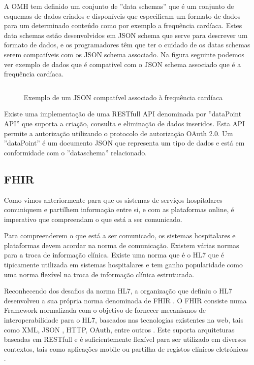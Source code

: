A \gls{OMH} tem definido um conjunto de ''data schemas'' que é um conjunto de esquemas de dados criados e disponíveis que especificam um formato de dados para um determinado conteúdo como por exemplo a frequência cardíaca\cite{omhschemas}. Estes data schemas estão desenvolvidos em \gls{JSON} schema que serve para descrever um formato de dados, e os programadores têm que ter o cuidado de os datas schemas serem compatíveis com os \gls{JSON} schema associado. Na figura seguinte podemos ver exemplo de dados que é compativel com o \gls{JSON} schema associado que é a frequência cardíaca\cite{omhheartrate}.


\begin{figure}[H]
\inputminted[fontsize=\scriptsize]{json}{code/heart-rate.json}
\caption[Exemplo de um \gls{JSON} compatível associado à frequência cardíaca]{Exemplo de um \gls{JSON} compatível associado à frequência cardíaca \cite{omhheartrate}}
\label{f:exemplo}
\end{figure}


Existe uma implementação de uma \gls{REST}full \gls{API} denominada por ''dataPoint API'' que suporta a criação, consulta e eliminação de dados inseridos. Esta \gls{API} permite a autorização utilizando o protocolo de autorização OAuth 2.0. Um ''dataPoint'' é um documento \gls{JSON} que representa um tipo de dados e está em conformidade com o ''dataschema'' relacionado.

\subsection{FHIR}

Como vimos anteriormente para que os sistemas de serviços hospitalares comuniquem e partilhem  informação entre si, e com as plataformas online, é imperativo que compreendam o que está a ser comunicado.
\par 
Para compreenderem o que está a ser comunicado, os sistemas hospitalares e plataformas devem acordar na norma de comunicação. Existem várias normas para a troca de informação clínica. Existe uma norma que é o \gls{HL7} que é tipicamente utilizada em sistemas hospitalares \cite{whyihe} e tem ganho popularidade como uma norma flexível na troca de informação clínica estruturada.


Reconhecendo dos desafios da norma \gls{HL7}, a organização que definiu o \gls{HL7} desenvolveu a sua própria norma denominada de \gls{FHIR} \cite{hl7fhir}. O \gls{FHIR} consiste numa Framework normalizada com o objetivo de fornecer mecanismos de interoperabilidade para o \gls{HL7}, baseados nas tecnologias existentes na web, tais como \gls{XML}, \gls{JSON} , \gls{HTTP}, OAuth, entre outros \cite{hl7fhir}. Este suporta arquiteturas baseadas em \gls{REST}full e é suficientemente flexível para ser utilizado em diversos contextos, tais como aplicações mobile ou partilha de registos clínicos eletrónicos \cite{hl7fhir}.


